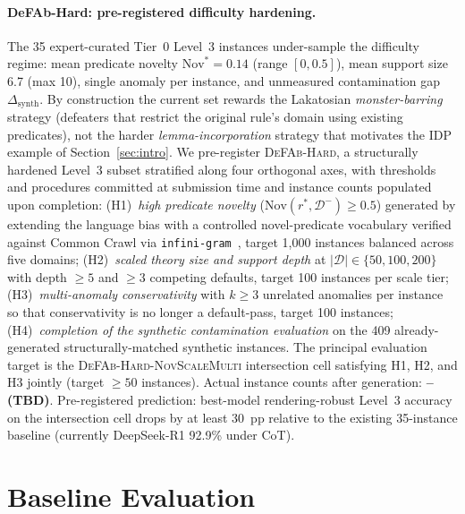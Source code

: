 \documentclass{article}
\theoremstyle{definition}
\newcommand{\D}{\mathcal{D}}
\newcommand{\Dm}{\mathcal{D}^{-}}
\newcommand{\Nov}{\mathrm{Nov}}
\begin{document}
\paragraph{DeFAb-Hard: pre-registered difficulty hardening.}
The 35 expert-curated Tier~0 Level~3 instances under-sample the difficulty regime: mean predicate novelty $\Nov^* = 0.14$ (range $[0, 0.5]$), mean support size 6.7 (max 10), single anomaly per instance, and unmeasured contamination gap $\Delta_{\mathrm{synth}}$. By construction the current set rewards the Lakatosian \emph{monster-barring} strategy (defeaters that restrict the original rule's domain using existing predicates), not the harder \emph{lemma-incorporation} strategy that motivates the IDP example of Section~\ref{sec:intro}. We pre-register \textsc{DeFAb-Hard}, a structurally hardened Level~3 subset stratified along four orthogonal axes, with thresholds and procedures committed at submission time and instance counts populated upon completion: (H1)~\emph{high predicate novelty} ($\Nov(r^*, \Dm) \geq 0.5$) generated by extending the language bias with a controlled novel-predicate vocabulary verified against Common Crawl via \texttt{infini-gram}~\cite{liu2024infini}, target 1{,}000 instances balanced across five domains; (H2)~\emph{scaled theory size and support depth} at $|\D| \in \{50, 100, 200\}$ with depth $\geq 5$ and $\geq 3$ competing defaults, target 100 instances per scale tier; (H3)~\emph{multi-anomaly conservativity} with $k \geq 3$ unrelated anomalies per instance so that conservativity is no longer a default-pass, target 100 instances; (H4)~\emph{completion of the synthetic contamination evaluation} on the 409 already-generated structurally-matched synthetic instances. The principal evaluation target is the \textsc{DeFAb-Hard-NovScaleMulti} intersection cell satisfying H1, H2, and H3 jointly (target $\geq 50$ instances). Actual instance counts after generation: \textbf{-- (TBD)}. Pre-registered prediction: best-model rendering-robust Level~3 accuracy on the intersection cell drops by at least 30~pp relative to the existing 35-instance baseline (currently DeepSeek-R1 92.9\% under CoT).


\section{Baseline Evaluation}\label{sec:evaluation}


\end{document}
